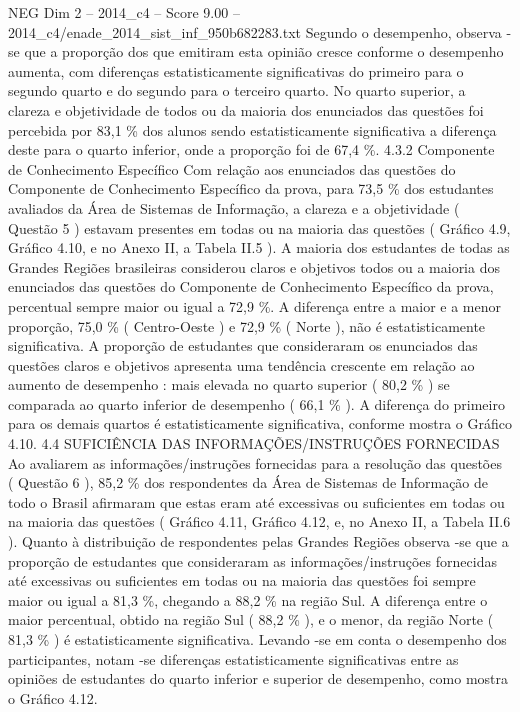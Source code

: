 \begin{textsample}{NEG Dim 2 – 2014\_c4 – Score 9.00 – 2014\_c4/enade\_2014\_sist\_inf\_950b682283.txt}
Segundo o desempenho, observa -se que a proporção dos que emitiram esta opinião cresce conforme o desempenho aumenta, com diferenças estatisticamente significativas do primeiro para o segundo quarto e do segundo para o terceiro quarto.
No quarto superior, a clareza e objetividade de todos ou da maioria dos enunciados das questões foi percebida por 83,1 \% dos alunos sendo estatisticamente significativa a diferença deste para o quarto inferior, onde a proporção foi de 67,4 \%. 4.3.2 Componente de Conhecimento Específico Com relação aos enunciados das questões do Componente de Conhecimento Específico da prova, para 73,5 \% dos estudantes avaliados da Área de Sistemas de Informação, a clareza e a objetividade ( Questão 5 ) estavam presentes em todas ou na maioria das questões ( Gráfico 4.9, Gráfico 4.10, e no Anexo II, a Tabela II.5 ).
A maioria dos estudantes de todas as Grandes Regiões brasileiras considerou claros e objetivos todos ou a maioria dos enunciados das questões do Componente de Conhecimento Específico da prova, percentual sempre maior ou igual a 72,9 \%.
A diferença entre a maior e a menor proporção, 75,0 \% ( Centro-Oeste ) e 72,9 \% ( Norte ), não é estatisticamente significativa.
A proporção de estudantes que consideraram os enunciados das questões claros e objetivos apresenta uma tendência crescente em relação ao aumento de desempenho : mais elevada no quarto superior ( 80,2 \% ) se comparada ao quarto inferior de desempenho ( 66,1 \% ).
A diferença do primeiro para os demais quartos é estatisticamente significativa, conforme mostra o Gráfico 4.10. 4.4 SUFICIÊNCIA DAS INFORMAÇÕES/INSTRUÇÕES FORNECIDAS Ao avaliarem as informações/instruções fornecidas para a resolução das questões ( Questão 6 ), 85,2 \% dos respondentes da Área de Sistemas de Informação de todo o Brasil afirmaram que estas eram até excessivas ou suficientes em todas ou na maioria das questões ( Gráfico 4.11, Gráfico 4.12, e, no Anexo II, a Tabela II.6 ).
Quanto à distribuição de respondentes pelas Grandes Regiões observa -se que a proporção de estudantes que consideraram as informações/instruções fornecidas até excessivas ou suficientes em todas ou na maioria das questões foi sempre maior ou igual a 81,3 \%, chegando a 88,2 \% na região Sul.
A diferença entre o maior percentual, obtido na região Sul ( 88,2 \% ), e o menor, da região Norte ( 81,3 \% ) é estatisticamente significativa.
Levando -se em conta o desempenho dos participantes, notam -se diferenças estatisticamente significativas entre as opiniões de estudantes do quarto inferior e superior de desempenho, como mostra o Gráfico 4.12.

\end{textsample}
